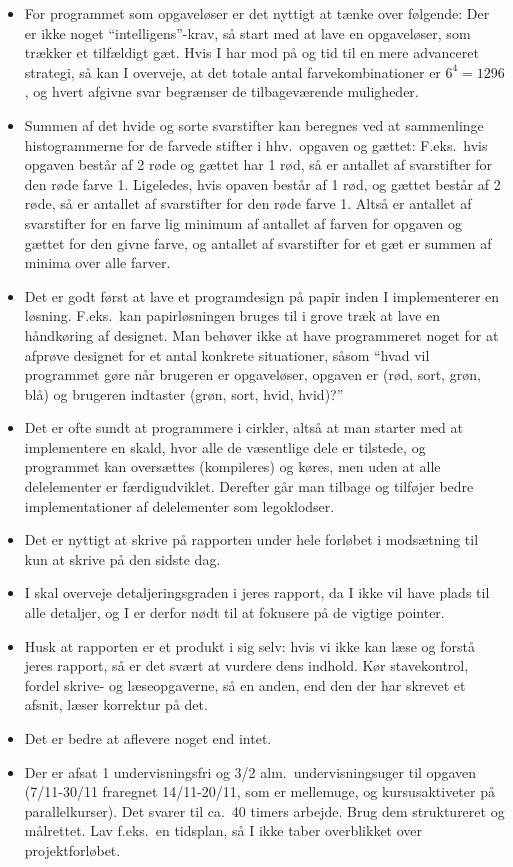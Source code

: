 \documentclass[a4paper,12pt]{article}
\begin{document}
\begin{enumerate}[label=8g.\arabic*,start=0]
\begin{itemize}
  \item For programmet som opgaveløser er det nyttigt at tænke over følgende: Der er ikke noget ``intelligens''-krav, så start med at lave en opgaveløser, som trækker et tilfældigt gæt. Hvis I har mod på og tid til en mere advanceret strategi, så kan I overveje, at det totale antal farvekombinationer er $6^4=1296$, og hvert afgivne svar begrænser de tilbageværende muligheder.
  \item Summen af det hvide og sorte svarstifter kan beregnes ved at sammenlinge histogrammerne for de farvede stifter i hhv.\ opgaven og gættet: F.eks.\ hvis opgaven består af 2 røde og gættet har 1 rød, så er antallet af svarstifter for den røde farve 1. Ligeledes, hvis opaven består af 1 rød, og gættet består af 2 røde, så er antallet af svarstifter for den røde farve 1. Altså er antallet af svarstifter for en farve lig minimum af antallet af farven for opgaven og gættet for den givne farve, og antallet af svarstifter for et gæt er summen af minima over alle farver. 
  \item Det er godt først at lave et programdesign på papir inden I implementerer en løsning. F.eks.\ kan papirløsningen bruges til i grove træk at lave en håndkøring af designet. Man behøver ikke at have programmeret noget for at afprøve designet for et antal konkrete situationer, såsom ``hvad vil programmet gøre når brugeren er opgaveløser, opgaven er (rød, sort, grøn, blå) og brugeren indtaster (grøn, sort, hvid, hvid)?''
  \item Det er ofte sundt at programmere i cirkler, altså at man starter med at implementere en skald, hvor alle de væsentlige dele er tilstede, og programmet kan oversættes (kompileres) og køres, men uden at alle delelementer er færdigudviklet. Derefter går man tilbage og tilføjer bedre implementationer af delelementer som legoklodser.
  \item Det er nyttigt at skrive på rapporten under hele forløbet i modsætning til kun at skrive på den sidste dag.
  \item I skal overveje detaljeringsgraden i jeres rapport, da I ikke vil have plads til alle detaljer, og I er derfor nødt til at fokusere på de vigtige pointer.
  \item Husk at rapporten er et produkt i sig selv: hvis vi ikke kan læse og forstå jeres rapport, så er det svært at vurdere dens indhold. Kør stavekontrol, fordel skrive- og læseopgaverne, så en anden, end den der har skrevet et afsnit, læser korrektur på det.
  \item Det er bedre at aflevere noget end intet.
  \item Der er afsat 1 undervisningsfri og 3/2 alm.\ undervisningsuger til opgaven (7/11-30/11 fraregnet 14/11-20/11, som er mellemuge, og kursusaktiveter på parallelkurser). Det svarer til ca.\ 40 timers arbejde. Brug dem struktureret og målrettet. Lav f.eks.\ en tidsplan, så I ikke taber overblikket over projektforløbet.
  \end{itemize}
\end{enumerate}
\end{document}
